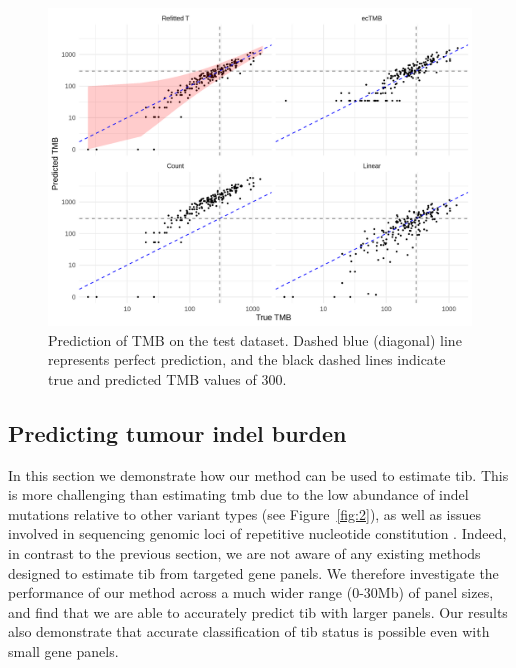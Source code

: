 \documentclass[12pt]{article}
\begin{document}
\begin{figure}[htbp]
\centering
\includegraphics[width=5.5in]{figures/fig8.png}
\vspace*{-5mm}
\caption{Prediction of TMB on the test dataset. Dashed blue (diagonal) line represents perfect prediction, and the black dashed lines indicate true and predicted TMB values of 300. \label{fig:8}}
\vspace*{-2mm}
\end{figure} 


\subsection{Predicting tumour indel burden \label{sec:indel}}



In this section we demonstrate how our method can be used to estimate \gls{tib}. 
This is more challenging than estimating \gls{tmb} due to the low abundance of indel mutations relative to other variant types (see Figure~\ref{fig:2}), as well as issues involved in sequencing genomic loci of repetitive nucleotide constitution \citep{narzisi_challenge_2015}. Indeed, in contrast to the previous section, we are not aware of any existing methods designed to estimate \gls{tib} from targeted gene panels.  We therefore investigate the performance of our method across a much wider range (0-30Mb) of panel sizes, and find that we are able to accurately predict \gls{tib} with larger panels.
Our results also demonstrate that accurate classification of \gls{tib} status is possible even with small gene panels. 
\end{document}
